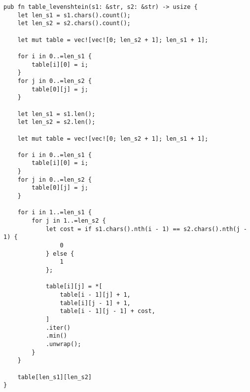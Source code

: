 \begin{center}
\captionsetup{justification=raggedright,singlelinecheck=off}
\begin{lstlisting}[label=lst:lev_table,caption=Функция нахождения расстояния Левенштейна динамически]
pub fn table_levenshtein(s1: &str, s2: &str) -> usize {
    let len_s1 = s1.chars().count();
    let len_s2 = s2.chars().count();

    let mut table = vec![vec![0; len_s2 + 1]; len_s1 + 1];

    for i in 0..=len_s1 {
        table[i][0] = i;
    }
    for j in 0..=len_s2 {
        table[0][j] = j;
    }

    let len_s1 = s1.len();
    let len_s2 = s2.len();

    let mut table = vec![vec![0; len_s2 + 1]; len_s1 + 1];

    for i in 0..=len_s1 {
        table[i][0] = i;
    }
    for j in 0..=len_s2 {
        table[0][j] = j;
    }

    for i in 1..=len_s1 {
        for j in 1..=len_s2 {
            let cost = if s1.chars().nth(i - 1) == s2.chars().nth(j - 1) {
                0
            } else {
                1
            };

            table[i][j] = *[
                table[i - 1][j] + 1,
                table[i][j - 1] + 1,
                table[i - 1][j - 1] + cost,
            ]
            .iter()
            .min()
            .unwrap();
        }
    }

    table[len_s1][len_s2]
}
\end{lstlisting}
\end{center}

\clearpage

